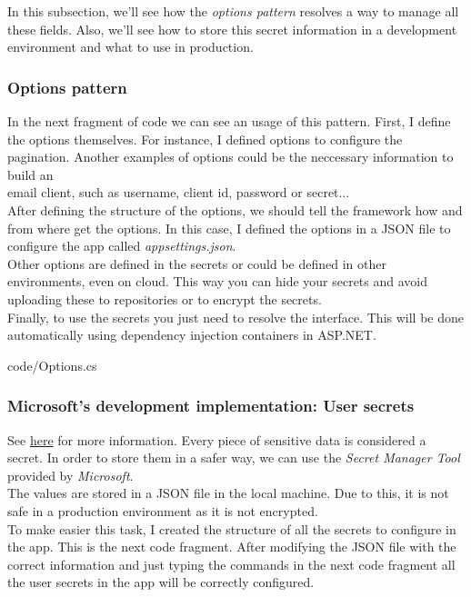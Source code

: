     In this subsection, we'll see how the \textit{options pattern} resolves a way to manage all these fields. Also, we'll see how to store this secret information in a development environment and what to use in production. \\

        \subsubsection{Options pattern}
        In the next fragment of code we can see an usage of this pattern. First, I define the options themselves. For instance, I defined options to configure the pagination. Another examples of options could be the neccessary information to build an \\
        email client, such as username, client id, password or secret... \\
        
        After defining the structure of the options, we should tell the framework how and from where get the options. In this case, I defined the options in a JSON file to configure the app called \textit{appsettings.json}. \\
        Other options are defined in the secrets or could be defined in other environments, even on cloud. This way you can hide your secrets and avoid uploading these to repositories or to encrypt the secrets. \\

        Finally, to use the secrets you just need to resolve the interface. This will be done automatically using dependency injection containers in ASP.NET.
            
            {code/Options.cs}
        \subsubsection{Microsoft's development implementation: User secrets}
        See \href{https://docs.microsoft.com/en-us/aspnet/core/security/app-secrets?view=aspnetcore-5.0&tabs=windows}{here} for more information. Every piece of sensitive data is considered a secret. In order to store them in a safer way, we can use the \textit{Secret Manager Tool} provided by \textit{Microsoft}. \\
        The values are stored in a JSON file in the local machine. Due to this, it is not safe in a production environment as it is not encrypted. \\
        To make easier this task, I created the structure of all the secrets to configure in the app. This is the next code fragment. After modifying the JSON file with the correct information and just typing the commands in the next code fragment all the user secrets in the app will be correctly configured. \\

